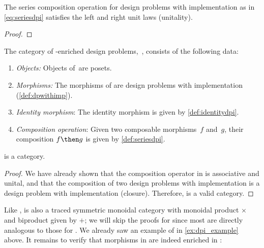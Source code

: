 \begin{lemma}
	The series composition operation for design problems with implementation as in \cref{eq:seriesdpi} satisfies the left and right unit laws (unitality).
\end{lemma}

\begin{proof}
\end{proof}

\begin{definition}
	The category of \Set-enriched design problems,~\DPI, consists of the following data:
	\begin{enumerate}
		\item \emph{Objects:}
		      Objects of~\DPI are posets.
		\item \emph{Morphisms:}
		      The morphisms of \DPI are design problems with implementation (\cref{def:dpwithimp}).
		\item \emph{Identity morphism}: The identity morphism is given by \cref{def:identitydpi}.
		\item \emph{Composition operation}: Given two composable morphisms~$f$ and~$g$, their composition $f\then g$ is given by \cref{def:seriesdpi}.
	\end{enumerate}
\end{definition}

\begin{lemma}
	\DPI is a category.
\end{lemma}

\begin{proof}
	We have already shown that the composition operator in \DPI is associative and unital, and that the composition of two design problems with implementation is a design problem with implementation (closure).
	Therefore, \DPI is a valid category.
\end{proof}

Like \DP, \DPI is also a traced symmetric monoidal category with monoidal product $\times$ and biproduct given by $+$; we will skip the proofs for \DPI since most are directly analogous to those for \DP.
We already saw an example of \DPI in \cref{ex:dpi_example} above.
It remains to verify that morphisms in \DPI are indeed enriched in \Set:


